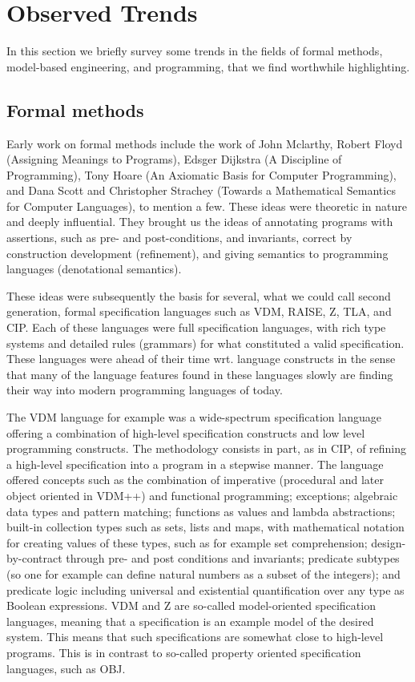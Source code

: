 
\section{Observed Trends}

In this section we briefly survey some trends in the fields of
formal methods, model-based engineering, and programming, that we find worthwhile highlighting.

\subsection{Formal methods}

Early work on formal methods include the work of John Mclarthy, 
Robert Floyd (Assigning Meanings to Programs), Edsger Dijkstra (A 
Discipline of Programming), Tony Hoare (An Axiomatic Basis for 
Computer Programming), and Dana Scott and Christopher Strachey 
(Towards a Mathematical Semantics for Computer Languages), to 
mention a few. These ideas were theoretic in nature and deeply 
influential. They brought us the ideas of  annotating programs with 
assertions, such as pre- and post-conditions, and invariants, 
correct by construction development (refinement), and giving 
semantics to programming languages (denotational semantics). 

These ideas were subsequently the basis for several, what we could 
call second generation, formal specification languages such as VDM, 
RAISE, Z, TLA, and CIP. Each of these languages were full 
specification languages, with rich type systems and detailed rules 
(grammars) for what constituted a valid specification. These 
languages were ahead of their time wrt. language constructs in the 
sense that many of the language features found in these languages 
slowly are finding their way into modern programming languages of 
today. 

The VDM language for example was a wide-spectrum specification 
language offering a combination of high-level specification 
constructs and low level programming constructs. The methodology 
consists in part, as in CIP, of refining a high-level specification 
into a program in a stepwise manner. The language offered concepts 
such as the combination of imperative (procedural and later object 
oriented in VDM++) and functional programming; exceptions; 
algebraic data types and pattern matching; functions as values and 
lambda abstractions; built-in collection types such as sets, lists 
and maps, with mathematical notation for creating values of these 
types, such as for example set comprehension; design-by-contract 
through pre- and post conditions and invariants; predicate subtypes 
(so one for example can define natural numbers as a subset of the 
integers);  and predicate logic including universal and existential 
quantification over any type as Boolean expressions.  VDM and Z are 
so-called model-oriented specification languages, meaning that a 
specification is an example model of the desired system. This means 
that such specifications are somewhat close to high-level programs. 
This is in contrast to so-called property oriented specification 
languages, such as OBJ.  

